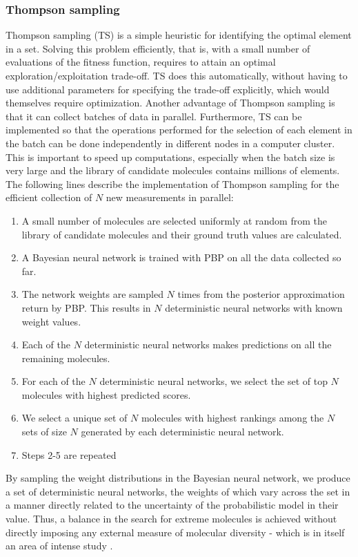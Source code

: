 \subsubsection{Thompson sampling}

Thompson sampling (TS) \cite{Thompson_1933} is a simple heuristic for identifying the optimal element in a set. Solving this problem efficiently, that is, with a small number of evaluations of the fitness function, requires to attain an optimal exploration/exploitation trade-off. TS does this automatically, without having to use additional parameters for specifying the trade-off explicitly, which would themselves require optimization. Another advantage of Thompson sampling is that it can collect batches of data in parallel. Furthermore, TS can be implemented so that the operations performed for the selection of each element in the batch can be done independently in different nodes in a computer cluster. This is important to speed up computations, especially when the batch size is very large and the library of candidate molecules contains millions of elements. The following lines describe the implementation of Thompson sampling for the efficient collection of $N$ new measurements in parallel:
\begin{enumerate}
\item A small number of molecules are selected uniformly at random from the library of candidate molecules and their ground truth values are calculated.
\item A Bayesian neural network is trained with PBP on all the data collected so far.
\item The network weights are sampled $N$ times from the posterior approximation return by PBP. This results in $N$ deterministic neural networks with known weight values.
\item Each of the $N$ deterministic neural networks makes predictions on all the remaining molecules.
\item For each of the $N$ deterministic neural networks, we select the set of top $N$ molecules with highest predicted scores.
\item We select a unique set of $N$ molecules with highest rankings among the $N$ sets of size $N$ generated by each deterministic neural network.
\item Steps 2-5 are repeated
\end{enumerate}
By sampling the weight distributions in the Bayesian neural network, we produce a set of deterministic neural networks, the weights of which vary across the set in a manner directly related to the uncertainty of the probabilistic model in their value.  Thus, a balance in the search for extreme molecules is achieved without directly imposing any external measure of molecular diversity - which is in itself an area of intense study \cite{Maldonado_2006}.